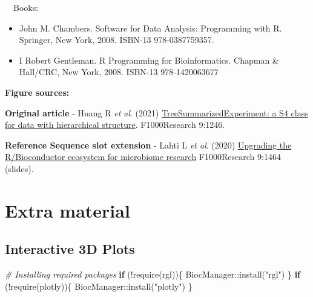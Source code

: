 \documentclass[
]{book}
\newenvironment{Shaded}{\begin{snugshade}}{\end{snugshade}}
\newcommand{\AttributeTok}[1]{\textcolor[rgb]{0.77,0.63,0.00}{#1}}
\newcommand{\CommentTok}[1]{\textcolor[rgb]{0.56,0.35,0.01}{\textit{#1}}}
\newcommand{\ControlFlowTok}[1]{\textcolor[rgb]{0.13,0.29,0.53}{\textbf{#1}}}
\newcommand{\FunctionTok}[1]{\textcolor[rgb]{0.00,0.00,0.00}{#1}}
\newcommand{\NormalTok}[1]{#1}
\newcommand{\SpecialCharTok}[1]{\textcolor[rgb]{0.00,0.00,0.00}{#1}}
\newcommand{\StringTok}[1]{\textcolor[rgb]{0.31,0.60,0.02}{#1}}
\providecommand{\tightlist}{%
  \setlength{\itemsep}{0pt}\setlength{\parskip}{0pt}}
\begin{document}
~~Books:

\begin{itemize}
\tightlist
\item
  John M. Chambers. Software for Data Analysis: Programming with R. Springer, New York, 2008. ISBN-13 978-0387759357.
\item
  I Robert Gentleman. R Programming for Bioinformatics. Chapman \& Hall/CRC, New York, 2008. ISBN-13 978-1420063677
\end{itemize}

\textbf{Figure sources:}

\textbf{Original article}
- Huang R \emph{et al}. (2021) \href{https://doi.org/10.12688/\%20f1000research.26669.2}{TreeSummarizedExperiment: a S4 class
for data with hierarchical structure}. F1000Research 9:1246.

\textbf{Reference Sequence slot extension}
- Lahti L \emph{et al}. (2020) \href{https://doi.org/10.7490/\%20f1000research.1118447.1}{Upgrading the R/Bioconductor ecosystem for microbiome
research} F1000Research 9:1464 (slides).

\hypertarget{extras}{%
\chapter{Extra material}\label{extras}}

\hypertarget{interactive-3d-plots}{%
\section{Interactive 3D Plots}\label{interactive-3d-plots}}

\begin{Shaded}
\begin{Highlighting}[]
\CommentTok{\# Installing required packages}
\ControlFlowTok{if}\NormalTok{ (}\SpecialCharTok{!}\FunctionTok{require}\NormalTok{(rgl))\{}
\NormalTok{  BiocManager}\SpecialCharTok{::}\FunctionTok{install}\NormalTok{(}\StringTok{"rgl"}\NormalTok{)  }
\NormalTok{\}}
\ControlFlowTok{if}\NormalTok{ (}\SpecialCharTok{!}\FunctionTok{require}\NormalTok{(plotly))\{}
\NormalTok{  BiocManager}\SpecialCharTok{::}\FunctionTok{install}\NormalTok{(}\StringTok{"plotly"}\NormalTok{)  }
\NormalTok{\}}
\end{Highlighting}
\end{Shaded}

\begin{Shaded}
\end{Shaded}
\end{document}
